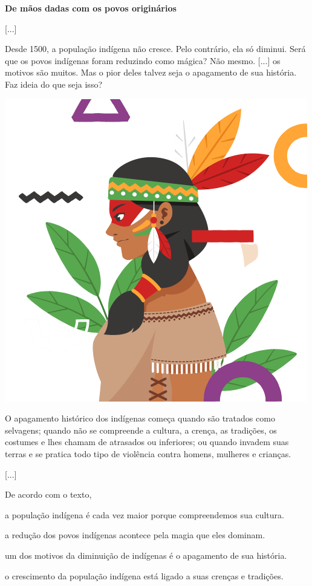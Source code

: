 \begin{myquote}
\textbf{De mãos dadas com os povos originários}

{[}...{]}

Desde 1500, a população indígena não cresce. Pelo contrário, ela só
diminui. Será que os povos indígenas foram reduzindo como mágica? Não
mesmo. {[}...{]} os motivos são muitos. Mas o pior deles talvez seja o
apagamento de sua história. Faz ideia do que seja isso?

\begin{center}
\includegraphics[width=.5\textwidth]{./media/image23h.png}
\end{center}


O apagamento histórico dos indígenas começa quando são tratados como
selvagens; quando não se compreende a cultura, a crença, as tradições,
os costumes e lhes chamam de atrasados ou inferiores; ou quando invadem
suas terras e se pratica todo tipo de violência contra homens, mulheres
e crianças.

{[}...{]}

\end{myquote}

De acordo com o texto,

\begin{escolha}
\item a população indígena é cada vez maior porque compreendemos sua cultura.

\item a redução dos povos indígenas acontece pela magia que eles dominam.

\item um dos motivos da diminuição de indígenas é o apagamento de sua história.

\item o crescimento da população indígena está ligado a suas crenças e tradições.
\end{escolha}



